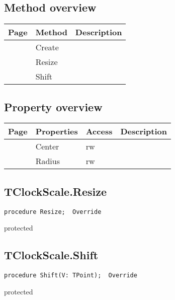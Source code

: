 \subsection{Method overview}
\label{hmi:retroclock:tclockscale:methods}
\begin{tabularx}{\textwidth}{llX}
Page & Method & Description  \\ \hline
\pageref{hmi:retroclock:tclockscale:create} & Create  &  \\
\pageref{hmi:retroclock:tclockscale:resize} & Resize  &  \\
\pageref{hmi:retroclock:tclockscale:shift} & Shift  &  \\
\hline
\end{tabularx}
\subsection{Property overview}
\label{hmi:retroclock:tclockscale:properties}
\begin{tabularx}{\textwidth}{lllX}
Page & Properties & Access & Description \\ \hline
\pageref{hmi:retroclock:tclockscale:center} & Center & rw &  \\
\pageref{hmi:retroclock:tclockscale:radius} & Radius & rw &  \\
\hline
\end{tabularx}
\subsection{TClockScale.Resize}
\label{hmi:retroclock:tclockscale:resize}
\begin{FPCList}
\Declaration 

\begin{verbatim}
procedure Resize;  Override
\end{verbatim}
\Visibility
protected
\end{FPCList}
\subsection{TClockScale.Shift}
\label{hmi:retroclock:tclockscale:shift}
\begin{FPCList}
\Declaration 

\begin{verbatim}
procedure Shift(V: TPoint);  Override
\end{verbatim}
\Visibility
protected
\end{FPCList}
